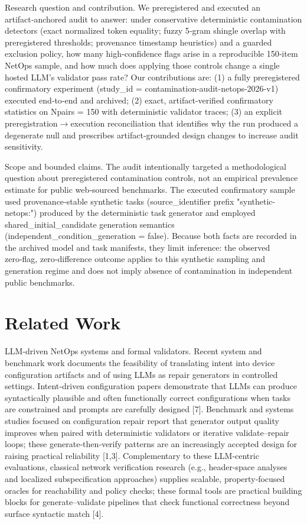 \documentclass[conference]{IEEEtran}
\begin{document}
Research question and contribution. We preregistered and executed an artifact‑anchored audit to answer: under conservative deterministic contamination detectors (exact normalized token equality; fuzzy 5‑gram shingle overlap with preregistered thresholds; provenance timestamp heuristics) and a guarded exclusion policy, how many high‑confidence flags arise in a reproducible 150‑item NetOps sample, and how much does applying those controls change a single hosted LLM's validator pass rate? Our contributions are: (1) a fully preregistered confirmatory experiment (study\_id = contamination-audit-netops-2026-v1) executed end‑to‑end and archived; (2) exact, artifact‑verified confirmatory statistics on Npairs = 150 with deterministic validator traces; (3) an explicit preregistration\ensuremath{\rightarrow}execution reconciliation that identifies why the run produced a degenerate null and prescribes artifact‑grounded design changes to increase audit sensitivity.

Scope and bounded claims. The audit intentionally targeted a methodological question about preregistered contamination controls, not an empirical prevalence estimate for public web‑sourced benchmarks. The executed confirmatory sample used provenance‑stable synthetic tasks (source\_identifier prefix "synthetic-netops:") produced by the deterministic task generator and employed shared\_initial\_candidate generation semantics (independent\_condition\_generation = false). Because both facts are recorded in the archived model and task manifests, they limit inference: the observed zero‑flag, zero‑difference outcome applies to this synthetic sampling and generation regime and does not imply absence of contamination in independent public benchmarks.

\section{Related Work}
LLM‑driven NetOps systems and formal validators. Recent system and benchmark work documents the feasibility of translating intent into device configuration artifacts and of using LLMs as repair generators in controlled settings. Intent‑driven configuration papers demonstrate that LLMs can produce syntactically plausible and often functionally correct configurations when tasks are constrained and prompts are carefully designed [7]. Benchmark and systems studies focused on configuration repair report that generator output quality improves when paired with deterministic validators or iterative validate--repair loops; these generate‑then‑verify patterns are an increasingly accepted design for raising practical reliability [1,3]. Complementary to these LLM‑centric evaluations, classical network verification research (e.g., header‑space analyses and localized subspecification approaches) supplies scalable, property‑focused oracles for reachability and policy checks; these formal tools are practical building blocks for generate--validate pipelines that check functional correctness beyond surface syntactic match [4].
\end{document}
